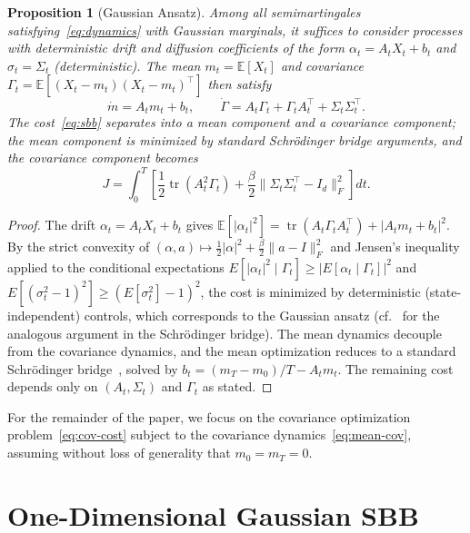 \documentclass[12pt]{article}
\newtheorem{proposition}[theorem]{Proposition}
\theoremstyle{definition}
\newcommand{\E}{\mathbb{E}}
\newcommand{\tr}{\operatorname{tr}}
\begin{document}
\begin{proposition}[Gaussian Ansatz]\label{prop:gaussian}
Among all semimartingales satisfying~\eqref{eq:dynamics} with Gaussian
marginals, it suffices to consider processes with deterministic drift
and diffusion coefficients of the form $\alpha_t = A_t X_t + b_t$ and
$\sigma_t = \Sigma_t$ (deterministic).
The mean $m_t = \E[X_t]$ and covariance
$\Gamma_t = \E[(X_t - m_t)(X_t - m_t)^\top]$ then satisfy
\begin{equation}\label{eq:mean-cov}
\dot m = A_t m_t + b_t, \qquad
\dot\Gamma = A_t \Gamma_t + \Gamma_t A_t^\top + \Sigma_t \Sigma_t^\top.
\end{equation}
The cost~\eqref{eq:sbb} separates into a mean component and a covariance
component; the mean component is minimized by standard Schr\"odinger bridge
arguments, and the covariance component becomes
\begin{equation}\label{eq:cov-cost}
J = \int_0^T \left[\frac{1}{2}\tr(A_t^2 \Gamma_t) +
  \frac{\beta}{2}\|\Sigma_t \Sigma_t^\top - I_d\|_F^2\right] dt.
\end{equation}
\end{proposition}

\begin{proof}
The drift $\alpha_t = A_t X_t + b_t$ gives
$\E[|\alpha_t|^2] = \tr(A_t \Gamma_t A_t^\top) + |A_t m_t + b_t|^2$.
By the strict convexity of $(\alpha, a) \mapsto \frac{1}{2}|\alpha|^2
+ \frac{\beta}{2}\|a - I\|_F^2$ and Jensen's inequality applied to the
conditional expectations
$E[|\alpha_t|^2 \mid \Gamma_t] \ge |E[\alpha_t \mid \Gamma_t]|^2$ and
$E[(\sigma_t^2 - 1)^2] \ge (E[\sigma_t^2] - 1)^2$,
the cost is minimized by deterministic (state-independent) controls,
which corresponds to the Gaussian ansatz
(cf.~\cite{CGP16} for the analogous argument in the Schr\"odinger bridge).
The mean dynamics decouple from the covariance dynamics, and the mean
optimization reduces to a standard Schr\"odinger bridge~\cite{CGP16},
solved by $b_t = (m_T - m_0)/T - A_t m_t$.
The remaining cost depends only on $(A_t, \Sigma_t)$ and $\Gamma_t$ as
stated.
\end{proof}

For the remainder of the paper, we focus on the covariance optimization
problem~\eqref{eq:cov-cost} subject to the covariance
dynamics~\eqref{eq:mean-cov}, assuming without loss of generality that
$m_0 = m_T = 0$.

\section{One-Dimensional Gaussian SBB}\label{sec:1d}
\end{document}
